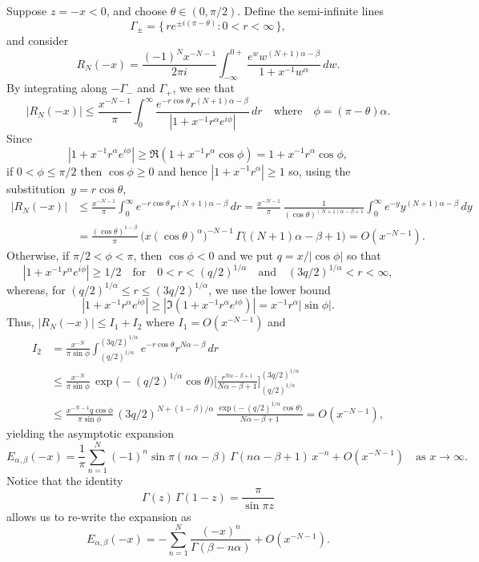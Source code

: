 \documentclass[12pt,a4paper]{article}
\begin{document}
Suppose $z=-x<0$, and choose $\theta\in(0,\pi/2)$.  Define the semi-infinite
lines
\[
\varGamma_\pm=\{\,re^{\pm i(\pi-\theta)}:0<r<\infty\,\},
\]
and consider
\[
R_N(-x)=\frac{(-1)^Nx^{-N-1}}{2\pi i}\int_{-\infty}^{0+}
    \frac{e^w w^{(N+1)\alpha-\beta}}{1+x^{-1}w^\alpha}\,dw.
\]
By integrating along $-\varGamma_-$ and $\varGamma_+$, we see that
\[
|R_N(-x)|\le\frac{x^{-N-1}}{\pi}\int_0^\infty
\frac{e^{-r\cos\theta}r^{(N+1)\alpha-\beta}}%
{|1+x^{-1}r^\alpha e^{i\phi}|}\,dr\quad\text{where}\quad
\phi=(\pi-\theta)\alpha.
\]
Since
\[
|1+x^{-1}r^\alpha e^{i\phi}|\ge\Re(1+x^{-1}r^\alpha\cos\phi)
    =1+x^{-1}r^\alpha\cos\phi,
\]
if $0<\phi\le\pi/2$ then $\cos\phi\ge0$ and hence $|1+x^{-1}r^\alpha|\ge1$ so,
using the substitution~$y=r\cos\theta$,
\begin{align*}
|R_N(-x)|&\le\frac{x^{-N-1}}{\pi}\int_0^\infty 
    e^{-r\cos\theta}r^{(N+1)\alpha-\beta}\,dr
    =\frac{x^{-N-1}}{\pi}\,\frac{1}{(\cos\theta)^{(N+1)\alpha-\beta+1}}
    \int_0^\infty e^{-y}y^{(N+1)\alpha-\beta}\,dy\\
    &=\frac{(\cos\theta)^{1-\beta}}{\pi}\,
    \bigl(x(\cos\theta)^\alpha\bigr)^{-N-1}\,
    \Gamma\bigl((N+1)\alpha-\beta+1\bigr)=O(x^{-N-1}).
\end{align*}
Otherwise, if $\pi/2<\phi<\pi$, then $\cos\phi<0$ and we put $q=x/|\cos\phi|$ 
so that
\[
|1+x^{-1}r^\alpha e^{i\phi}|\ge1/2\quad\text{for}\quad 0<r<(q/2)^{1/\alpha}
\quad\text{and}\quad (3q/2)^{1/\alpha}<r<\infty,
\]
whereas, for $(q/2)^{1/\alpha}\le r\le(3q/2)^{1/\alpha}$, we use the lower bound
\[
|1+x^{-1}r^\alpha e^{i\phi}|\ge|\Im(1+x^{-1}r^\alpha e^{i\phi})|
    =x^{-1}r^\alpha|\sin\phi|.
\]
Thus, $|R_N(-x)|\le I_1+I_2$ where $I_1=O(x^{-N-1})$ and
\begin{align*}
I_2&=\frac{x^{-N}}{\pi\sin\phi}\int_{(q/2)^{1/\alpha}}^{(3q/2)^{1/\alpha}}
    e^{-r\cos\theta}r^{N\alpha-\beta}\,dr\\
&\le\frac{x^{-N}}{\pi\sin\phi}\,\exp\bigl(-(q/2)^{1/\alpha}\cos\theta\bigr)
    \biggl[\frac{r^{N\alpha-\beta+1}}{N\alpha-\beta+1}
    \biggr]_{(q/2)^{1/\alpha}}^{(3q/2)^{1/\alpha}}\\
&\le\frac{x^{-N-1}q\cos\phi}{\pi\sin\phi}\,(3q/2)^{N+(1-\beta)/\alpha}\,
\frac{\exp\bigl(-(q/2)^{1/\alpha}\cos\theta\bigr)}{N\alpha-\beta+1}
=O(x^{-N-1}),
\end{align*}
yielding the asymptotic expansion
\[
E_{\alpha,\beta}(-x)=\frac{1}{\pi}\sum_{n=1}^N(-1)^n
    \sin\pi(n\alpha-\beta)\,\Gamma(n\alpha-\beta+1)\,x^{-n}
    +O(x^{-N-1})\quad\text{as $x\to\infty$.}
\]
Notice that the identity
\[
\Gamma(z)\,\Gamma(1-z)=\frac{\pi}{\sin\pi z}
\]
allows us to re-write the expansion as
\[
E_{\alpha,\beta}(-x)=-\sum_{n=1}^N\frac{(-x)^n}{\Gamma(\beta-n\alpha)}
    +O(x^{-N-1}).
\]
\end{document}
